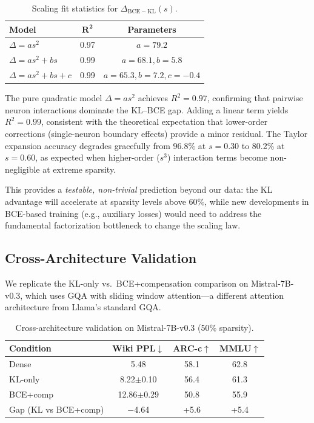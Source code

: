 \documentclass[11pt,a4paper]{article}
\begin{document}
\begin{table}[t]
\centering
\small
\caption{Scaling fit statistics for $\Delta_{\mathrm{BCE-KL}}(s)$.}
\label{tab:fitstat}
\begin{tabular}{lcc}
\toprule
\textbf{Model} & $\boldsymbol{R^2}$ & \textbf{Parameters} \\
\midrule
$\Delta = as^2$ & 0.97 & $a = 79.2$ \\
$\Delta = as^2 + bs$ & 0.99 & $a = 68.1, b = 5.8$ \\
$\Delta = as^2 + bs + c$ & 0.99 & $a = 65.3, b = 7.2, c = -0.4$ \\
\bottomrule
\end{tabular}
\end{table}

The pure quadratic model $\Delta = as^2$ achieves $R^2 = 0.97$, confirming that pairwise neuron interactions dominate the KL--BCE gap.
Adding a linear term yields $R^2 = 0.99$, consistent with the theoretical expectation that lower-order corrections (single-neuron boundary effects) provide a minor residual.
The Taylor expansion accuracy degrades gracefully from 96.8\% at $s = 0.30$ to 80.2\% at $s = 0.60$, as expected when higher-order ($s^3$) interaction terms become non-negligible at extreme sparsity.

This provides a \emph{testable, non-trivial} prediction beyond our data: the KL advantage will accelerate at sparsity levels above 60\%, while new developments in BCE-based training (e.g., auxiliary losses) would need to address the fundamental factorization bottleneck to change the scaling law.

\subsection{Cross-Architecture Validation}
\label{sec:crossarch}

We replicate the KL-only vs.\ BCE+compensation comparison on Mistral-7B-v0.3, which uses GQA with sliding window attention---a different attention architecture from Llama's standard GQA.

\begin{table}[t]
\centering
\small
\caption{Cross-architecture validation on Mistral-7B-v0.3 (50\% sparsity).}
\label{tab:mistral}
\begin{tabular}{lccc}
\toprule
\textbf{Condition} & \textbf{Wiki PPL$\downarrow$} & \textbf{ARC-c$\uparrow$} & \textbf{MMLU$\uparrow$} \\
\midrule
Dense & 5.48 & 58.1 & 62.8 \\
KL-only & 8.22\small{$\pm$0.10} & 56.4 & 61.3 \\
BCE+comp & 12.86\small{$\pm$0.29} & 50.8 & 55.9 \\
\midrule
Gap (KL vs BCE+comp) & $-$4.64 & +5.6 & +5.4 \\
\bottomrule
\end{tabular}
\end{table}
\end{document}
